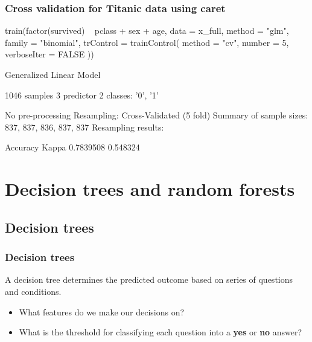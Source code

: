 \documentclass[a4paper]{article}
\begin{document}
\subsubsection{Cross validation for Titanic data using caret}
\begin{Schunk}
\begin{Sinput}
train(factor(survived) ~ pclass + sex + age,
      data = x_full, 
      method = "glm",
      family = "binomial",
      trControl = trainControl(
        method = "cv", number = 5,
        verboseIter = FALSE
      ))
\end{Sinput}
\begin{Soutput}
Generalized Linear Model 

1046 samples
   3 predictor
   2 classes: '0', '1' 

No pre-processing
Resampling: Cross-Validated (5 fold) 
Summary of sample sizes: 837, 837, 836, 837, 837 
Resampling results:

  Accuracy   Kappa   
  0.7839508  0.548324
\end{Soutput}
\end{Schunk}
\newpage
\section{Decision trees and random forests}\label{sec:32}
\subsection{Decision trees}
\subsubsection{Decision trees}
A decision tree determines the predicted outcome based on series of questions and conditions.
\begin{tcolorbox}[greenstylecolor, title=How to build a tree?]
	\begin{itemize}
		\item What features do we make our decisions on?
		\item What is the threshold for classifying each question into a \textbf{yes} or \textbf{no} answer?
	\end{itemize}
\end{tcolorbox}
\end{document}
